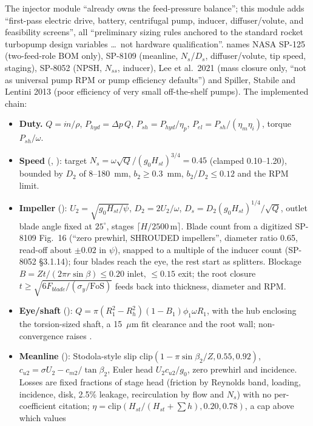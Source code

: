 The injector module ``already owns the feed-pressure balance''; this module adds
``first-pass electric drive, battery, centrifugal pump, inducer, diffuser/volute,
and feasibility screens'', all ``preliminary sizing rules anchored to the standard
rocket turbopump design variables \ldots\ not hardware qualification''.
 names NASA SP-125 (two-feed-role BOM only), SP-8109
(meanline, $N_s$/$D_s$, diffuser/volute, tip speed, staging), SP-8052 (NPSH,
$N_{ss}$, inducer), Lee et al.\ 2021 (mass closure only, ``not as universal pump
RPM or pump efficiency defaults'') and Spiller, Stabile and Lentini 2013 (poor
efficiency of very small off-the-shelf pumps). The implemented chain:
\begin{itemize}
\item \textbf{Duty.} $Q=\dot m/\rho$, $P_{hyd}=\Delta p\,Q$, $P_{sh}=P_{hyd}/\eta_p$,
$P_{el}=P_{sh}/(\eta_m\eta_i)$, torque $P_{sh}/\omega$.
\item \textbf{Speed} (, ): target
$N_s=\omega\sqrt Q/(g_0H_{st})^{3/4}=0.45$ (clamped 0.10--1.20), bounded by
$D_2$ of 8--180~mm, $b_2\ge0.3$~mm, $b_2/D_2\le0.12$ and the RPM limit.
\item \textbf{Impeller} (): $U_2=\sqrt{g_0H_{st}/\psi}$, $D_2=2U_2/\omega$,
$D_s=D_2(g_0H_{st})^{1/4}/\sqrt Q$, outlet blade angle fixed at $25^\circ$, stages
$\lceil H/2500\,\mathrm{m}\rceil$. Blade count from a digitized SP-8109 Fig.~16
(``zero prewhirl, SHROUDED impellers'', diameter ratio 0.65, read-off about
$\pm0.02$ in $\psi$), snapped to a multiple of the inducer count (SP-8052
\S3.1.14); four blades reach the eye, the rest start as splitters. Blockage
$B=Zt/(2\pi r\sin\beta)\le0.20$ inlet, $\le0.15$ exit; the root closure
$t\ge\sqrt{6F_{blade}/(\sigma_y/\mathrm{FoS})}$ feeds back into thickness,
diameter and RPM.
\item \textbf{Eye/shaft} (): $Q=\pi(R_1^2-R_h^2)(1-B_1)\phi_1\omega R_1$,
with the hub enclosing the torsion-sized shaft, a 15~$\mu$m fit clearance and the
root wall; non-convergence raises .
\item \textbf{Meanline} (): Stodola-style slip
$\mathrm{clip}(1-\pi\sin\beta_2/Z,0.55,0.92)$, $c_{u2}=\sigma U_2-c_{m2}/\tan\beta_2$,
Euler head $U_2c_{u2}/g_0$, zero prewhirl and incidence. Losses are fixed fractions
of stage head (friction by Reynolds band, loading, incidence, disk, 2.5\% leakage,
recirculation by flow and $N_s$) with no per-coefficient citation;
$\eta=\mathrm{clip}(H_{st}/(H_{st}+\sum h),0.20,0.78)$, a cap above which values

\end{itemize}
